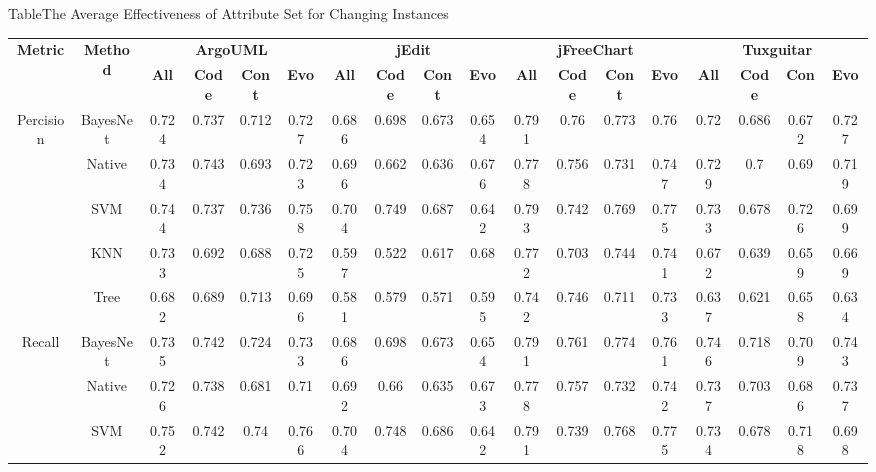 {\begin{table*}[htbp]
\scriptsize
{Table$\!$}{The Average Effectiveness of Attribute Set for Changing Instances}
\vspace{0.5em}
\centering
\begin{tabular}{cccccccccccccccccc}
\toprule[1.5pt]
\multirow{2}{*}{\textbf{Metric}}&\multirow{2}{*}{\textbf{Method}}&\multicolumn{4}{c}{\textbf{ArgoUML}}&\multicolumn{4}{c}{\textbf{jEdit}}&\multicolumn{4}{c}{\textbf{jFreeChart}}&\multicolumn{4}{c}{\textbf{Tuxguitar}}\\
\cline{3-18}
&&\textbf{All}&\textbf{Code}&\textbf{Cont}&\textbf{Evo}&\textbf{All}&\textbf{Code}&\textbf{Cont}&\textbf{Evo}&\textbf{All}&\textbf{Code}&\textbf{Cont}&\textbf{Evo}&\textbf{All}&\textbf{Code}&\textbf{Con}&\textbf{Evo}~\\
\midrule[1pt]
\multirow{5}{*}{Percision}
&BayesNet&	0.724&	0.737&	0.712&	0.727&		0.686&	0.698&	0.673&	0.654&	0.791&	0.76&	0.773&	0.76&		0.72&	0.686&	0.672&	0.727\\
&Native&	0.734&	0.743&	0.693&	0.723&		0.696&	0.662&	0.636&	0.676&	0.778&	0.756&	0.731&	0.747&		0.729&	0.7	&0.69&	0.719\\
&SVM&	0.744&	0.737&	0.736&	0.758&		0.704&	0.749&	0.687&	0.642&		0.793&	0.742&	0.769&	0.775&		0.733&	0.678&	0.726&	0.699\\
&KNN&	0.733&	0.692&	0.688&	0.725&		0.597&	0.522&	0.617&	0.68&		0.772&	0.703&	0.744&	0.741&		0.672&	0.639&	0.659&	0.669\\
&Tree&	0.682&	0.689&	0.713&	0.696&		0.581&	0.579&	0.571&	0.595&		0.742&	0.746&	0.711&	0.733&		0.637&	0.621&	0.658&	0.634\\
\hline
\multirow{5}{*}{Recall}
&BayesNet&	0.735&	0.742&	0.724&	0.733&		0.686&	0.698&	0.673&	0.654&	0.791&	0.761&	0.774&	0.761&		0.746&	0.718&	0.709&	0.743\\
&Native&	0.726&	0.738&	0.681&	0.71&		0.692&	0.66&	0.635&	0.673&		0.778&	0.757&	0.732&	0.742&		0.737&	0.703&	0.686&	0.737\\
&SVM&	0.752&	0.742&	0.74&	0.766&		0.704&	0.748&	0.686&	0.642&		0.791&	0.739&	0.768&	0.775&		0.734&	0.678&	0.718&	0.698\\

\end{tabular}
\end{table*}}
